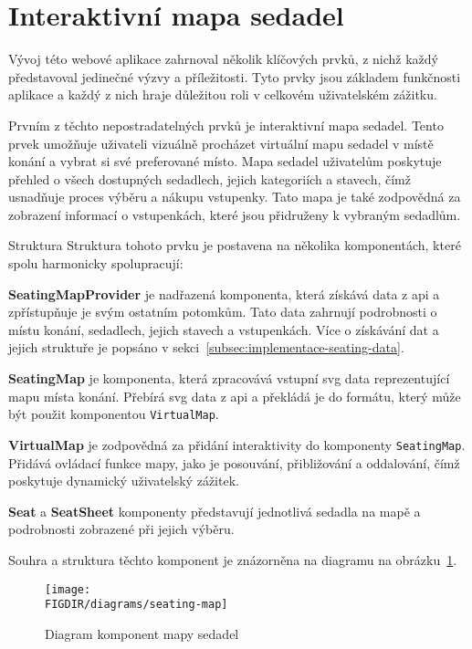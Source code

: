 \section{Interaktivní mapa sedadel}
\label{sec:implementace-seating}
Vývoj této webové aplikace zahrnoval několik klíčových prvků, z nichž každý představoval jedinečné výzvy a příležitosti.
Tyto prvky jsou základem funkčnosti aplikace a každý z nich hraje důležitou roli v celkovém uživatelském zážitku.

Prvním z těchto nepostradatelných prvků je interaktivní mapa sedadel.
Tento prvek umožňuje uživateli vizuálně procházet virtuální mapu sedadel v místě konání a vybrat si své preferované místo.
Mapa sedadel uživatelům poskytuje přehled o všech dostupných sedadlech, jejich kategoriích a stavech, čímž usnadňuje proces výběru a nákupu vstupenky.
Tato mapa je také zodpovědná za zobrazení informací o vstupenkách, které jsou přidruženy k vybraným sedadlům.

\begin{subsection}{Struktura}
    \label{subsec:implementace-seating-struktura}
    Struktura tohoto prvku je postavena na několika komponentách, které spolu harmonicky spolupracují:

    \textbf{SeatingMapProvider} je nadřazená komponenta, která získává data z \ac{api} a zpřístupňuje je svým ostatním potomkům.
    Tato data zahrnují podrobnosti o místu konání, sedadlech, jejich stavech a vstupenkách.
    Více o získávání dat a jejich struktuře je popsáno v sekci~\ref{subsec:implementace-seating-data}.

    \textbf{SeatingMap} je komponenta, která zpracovává vstupní \ac{svg} data reprezentující mapu místa konání.
    Přebírá \ac{svg} data z \ac{api} a překládá je do formátu, který může být použit komponentou \texttt{VirtualMap}.

    \textbf{VirtualMap} je zodpovědná za přidání interaktivity do komponenty \texttt{SeatingMap}.
    Přidává ovládací funkce mapy, jako je posouvání, přibližování a oddalování, čímž poskytuje dynamický uživatelský zážitek.

    \textbf{Seat} a \textbf{SeatSheet} komponenty představují jednotlivá sedadla na mapě a podrobnosti zobrazené při jejich výběru.

    Souhra a struktura těchto komponent je znázorněna na diagramu na obrázku~\ref{fig:seating-map-structure}.

    \begin{figure}[H]
        \centering
        \caption{Diagram komponent mapy sedadel}
        \texttt{[image: \\FIGDIR/diagrams/seating-map]}
        \source{}
        \label{fig:seating-map-structure}
    \end{figure}
\end{subsection}

